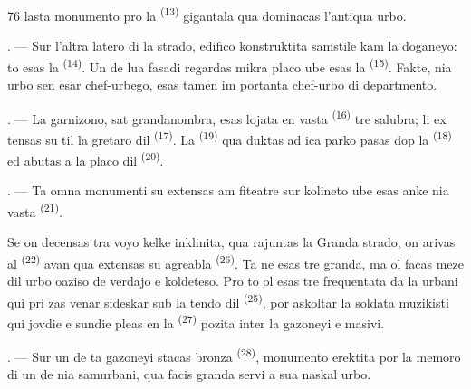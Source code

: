 \begin{VUpage}[78]{76}
\VUcontinue
lasta monumento pro la  \textsuperscript{(13)} gigantala\nl
qua dominacas l'antiqua urbo.

. --- Sur l'altra latero di la strado, \nl
edifico konstruktita samstile kam la doganeyo:\nl
to esas la  \textsuperscript{(14)}. Un de lua fasadi regardas\nl
mikra placo ube esas la  \textsuperscript{(15)}. Fakte,\nl
nia urbo sen esar chef-urbego, esas tamen im\cc
portanta chef-urbo di departmento.

\VUsaut{5.0mm}
\VUsaut{3.4mm}

. --- La garnizono, sat grandanombra, esas\nl
lojata en vasta  \textsuperscript{(16)} tre salubra; li ex\cc
tensas su til la gretaro dil  \textsuperscript{(17)}.\nl
La  \textsuperscript{(19)} qua duktas ad ica parko pasas\nl
dop la  \textsuperscript{(18)} ed abutas a la placo\nl
dil  \textsuperscript{(20)}.

. --- Ta omna monumenti su extensas am\cc
fiteatre sur kolineto ube esas anke nia vasta\nl
{} \textsuperscript{(21)}.

\VUblancAlinea
Se on decensas tra voyo kelke inklinita, qua\nl
rajuntas la Granda strado, on arivas al\nl
{} \textsuperscript{(22)} avan qua extensas su agreabla\nl
{} \textsuperscript{(26)}. Ta  ne\nl
esas tre granda, ma ol facas meze dil urbo\nl
oaziso de verdajo e koldeteso. Pro to ol\nl
esas tre frequentata da la urbani qui pri\cc
zas venar sideskar sub la tendo dil \cc
{} \textsuperscript{(25)}, por askoltar la soldata muzikisti qui\nl
jovdie e sundie pleas en la  \textsuperscript{(27)} pozita\nl
inter la gazoneyi e masivi.

. --- Sur un de ta gazoneyi stacas bronza\nl
{} \textsuperscript{(28)}, monumento erektita por la memoro\nl
di un de nia samurbani, qua facis granda servi\nl
a sua naskal urbo.
\end{VUpage}

